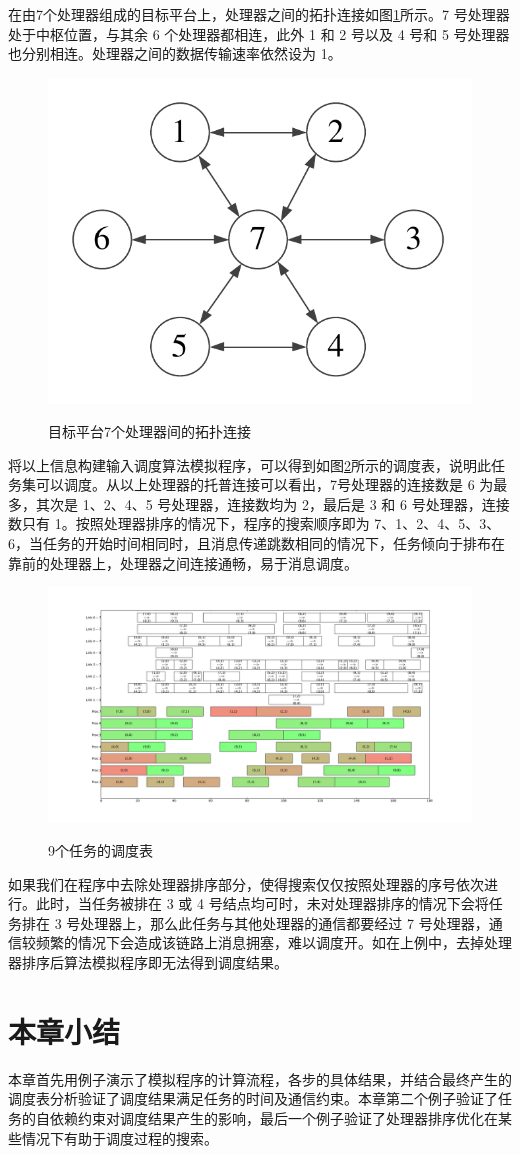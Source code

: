 在由7个处理器组成的目标平台上，处理器之间的拓扑连接如图\ref{EXP-fig-7p-link}所示。7 号处理器处于中枢位置，与其余 6 个处理器都相连，此外 1 和 2 号以及 4 号和 5 号处理器也分别相连。处理器之间的数据传输速率依然设为 1。
\begin{figure}[!hbt]
  \centering
  \includegraphics[height=20ex]{figure/EXP-7p-link.pdf}\\
  \caption{目标平台7个处理器间的拓扑连接}\label{EXP-fig-7p-link}
\end{figure}

将以上信息构建输入调度算法模拟程序，可以得到如图\ref{EXP-fig-9task}所示的调度表，说明此任务集可以调度。从以上处理器的托普连接可以看出，7号处理器的连接数是 6 为最多，其次是 1、2、4、5 号处理器，连接数均为 2，最后是 3 和 6 号处理器，连接数只有 1。按照处理器排序的情况下，程序的搜索顺序即为 7、1、2、4、5、3、6，当任务的开始时间相同时，且消息传递跳数相同的情况下，任务倾向于排布在靠前的处理器上，处理器之间连接通畅，易于消息调度。
\begin{figure}[!hbt]
  \centering
  \includegraphics[width=40em]{figure/EXP-9task-sched.pdf}\\
  \caption{9个任务的调度表}\label{EXP-fig-9task}
\end{figure}

如果我们在程序中去除处理器排序部分，使得搜索仅仅按照处理器的序号依次进行。此时，当任务被排在 3 或 4 号结点均可时，未对处理器排序的情况下会将任务排在 3 号处理器上，那么此任务与其他处理器的通信都要经过 7 号处理器，通信较频繁的情况下会造成该链路上消息拥塞，难以调度开。如在上例中，去掉处理器排序后算法模拟程序即无法得到调度结果。

\section{本章小结}

本章首先用例子演示了模拟程序的计算流程，各步的具体结果，并结合最终产生的调度表分析验证了调度结果满足任务的时间及通信约束。本章第二个例子验证了任务的自依赖约束对调度结果产生的影响，最后一个例子验证了处理器排序优化在某些情况下有助于调度过程的搜索。
